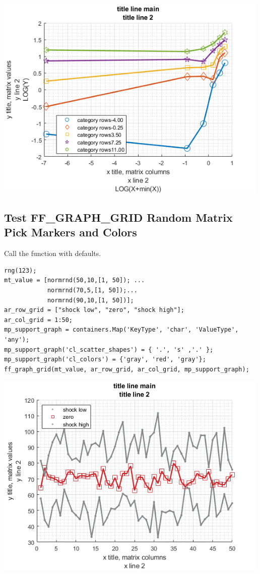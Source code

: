 \documentclass[
]{book}
\begin{document}
\includegraphics[width=5.20833in,height=\textheight]{img/fx_graph_grid_images/figure_1.png}

\hypertarget{test-ff_graph_grid-random-matrix-pick-markers-and-colors}{%
\subsection{Test FF\_GRAPH\_GRID Random Matrix Pick Markers and Colors}\label{test-ff_graph_grid-random-matrix-pick-markers-and-colors}}

Call the function with defaults.

\begin{verbatim}
rng(123);
mt_value = [normrnd(50,10,[1, 50]); ...
            normrnd(70,5,[1, 50]);...
            normrnd(90,10,[1, 50])];
ar_row_grid = ["shock low", "zero", "shock high"];
ar_col_grid = 1:50;
mp_support_graph = containers.Map('KeyType', 'char', 'ValueType', 'any');
mp_support_graph('cl_scatter_shapes') = { '.', 's' ,'.' };
mp_support_graph('cl_colors') = {'gray', 'red', 'gray'};
ff_graph_grid(mt_value, ar_row_grid, ar_col_grid, mp_support_graph);
\end{verbatim}

\includegraphics[width=5.20833in,height=\textheight]{img/fx_graph_grid_images/figure_2.png}
\end{document}
